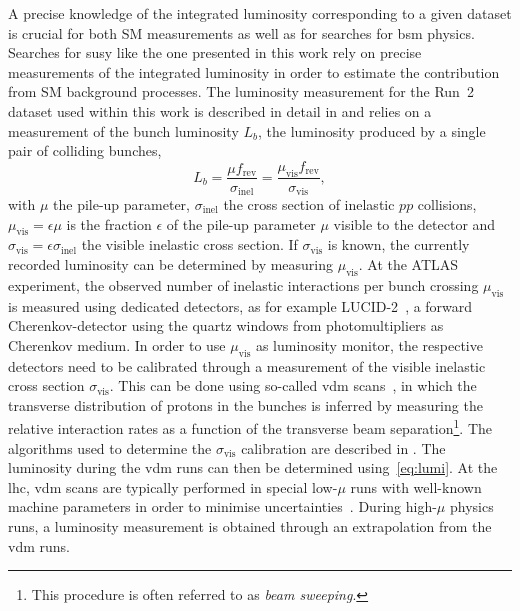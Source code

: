 A precise knowledge of the integrated luminosity corresponding to a given dataset is crucial for both SM measurements as well as for searches for \gls{bsm} physics.
Searches for \gls{susy} like the one presented in this work rely on precise measurements of the integrated luminosity in order to estimate the contribution from SM background processes.
The luminosity measurement for the Run~2 dataset used within this work is described in detail in \cite{ATLAS-CONF-2019-021,Aaboud:2016hhf} and relies on a measurement of the bunch luminosity $L_b$, \ie the luminosity produced by a single pair of colliding bunches,
\begin{equation}
	L_b = \frac{\mu f_\mathrm{rev}}{	\sigma_\mathrm{inel}} = \frac{\mu_\mathrm{vis}f_\mathrm{rev}}{\sigma_\mathrm{vis}},
\end{equation}
with $\mu$ the pile-up parameter, $\sigma_\mathrm{inel}$ the cross section of inelastic $pp$ collisions, $\mu_\mathrm{vis} = \epsilon \mu$ is the fraction $\epsilon$ of the pile-up parameter $\mu$ visible to the detector and $\sigma_\mathrm{vis} = \epsilon\sigma_\mathrm{inel}$ the visible inelastic cross section.
If $\sigma_\mathrm{vis}$ is known, the currently recorded luminosity can be determined by measuring $\mu_\mathrm{vis}$.
At the ATLAS experiment, the observed number of inelastic interactions per bunch crossing $\mu_\mathrm{vis}$ is measured using dedicated detectors, as for example LUCID-2~\cite{Avoni_2018}, a forward Cherenkov-detector using the quartz windows from photomultipliers as Cherenkov medium.
In order to use $\mu_\mathrm{vis}$ as luminosity monitor, the respective detectors need to be calibrated through a measurement of the visible inelastic cross section $\sigma_\mathrm{vis}$.
This can be done using so-called \gls{vdm} scans~\cite{vanderMeer:296752,GRAFSTROM201597}, in which the transverse distribution of protons in the bunches is inferred by measuring the relative interaction rates as a function of the transverse beam separation\footnote{This procedure is often referred to as \textit{beam sweeping}.}.
The algorithms used to determine the $\sigma_\mathrm{vis}$ calibration are described in \cite{ATLAS-CONF-2019-021,Aaboud:2016hhf}.
The luminosity during the \gls{vdm} runs can then be determined using~\cref{eq:lumi}. At the \gls{lhc}, \gls{vdm} scans are typically performed in special low-$\mu$ runs with well-known machine parameters in order to minimise uncertainties~\cite{ATLAS-CONF-2019-021}.
During high-$\mu$ physics runs, a luminosity measurement is obtained through an extrapolation from the \gls{vdm} runs.

